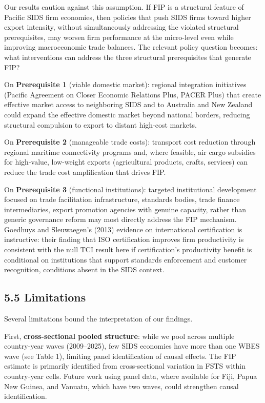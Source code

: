\documentclass[
  12pt]{article}
\begin{document}
Our results caution against this assumption. If FIP is a structural
feature of Pacific SIDS firm economies, then policies that push SIDS
firms toward higher export intensity, without simultaneously addressing
the violated structural prerequisites, may worsen firm performance at
the micro-level even while improving macroeconomic trade balances. The
relevant policy question becomes: what interventions can address the
three structural prerequisites that generate FIP?

On \textbf{Prerequisite 1} (viable domestic market): regional
integration initiatives (Pacific Agreement on Closer Economic Relations
Plus, PACER Plus) that create effective market access to neighboring
SIDS and to Australia and New Zealand could expand the effective
domestic market beyond national borders, reducing structural compulsion
to export to distant high-cost markets.

On \textbf{Prerequisite 2} (manageable trade costs): transport cost
reduction through regional maritime connectivity programs and, where
feasible, air cargo subsidies for high-value, low-weight exports
(agricultural products, crafts, services) can reduce the trade cost
amplification that drives FIP.

On \textbf{Prerequisite 3} (functional institutions): targeted
institutional development focused on trade facilitation infrastructure,
standards bodies, trade finance intermediaries, export promotion
agencies with genuine capacity, rather than generic governance reform
may most directly address the FIP mechanism. Goedhuys and Sleuwaegen's
(2013) evidence on international certification is instructive: their
finding that ISO certification improves firm productivity is consistent
with the null TCI result here if certification's productivity benefit is
conditional on institutions that support standards enforcement and
customer recognition, conditions absent in the SIDS context.

\hypertarget{limitations}{%
\subsection{5.5 Limitations}\label{limitations}}

Several limitations bound the interpretation of our findings.

First, \textbf{cross-sectional pooled structure}: while we pool across
multiple country-year waves (2009--2025), few SIDS economies have more
than one WBES wave (see Table 1), limiting panel identification of
causal effects. The FIP estimate is primarily identified from
cross-sectional variation in FSTS within country-year cells. Future work
using panel data, where available for Fiji, Papua New Guinea, and
Vanuatu, which have two waves, could strengthen causal identification.
\end{document}
